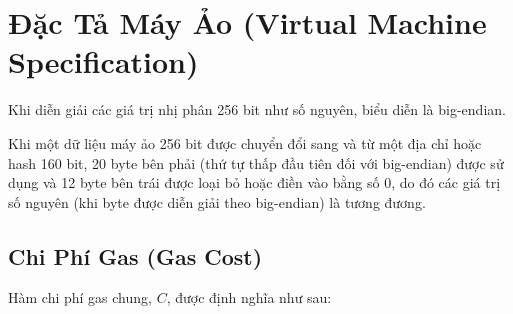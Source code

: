 \documentclass[9pt,oneside]{amsart}
\begin{document}
\section{Đặc Tả Máy Ảo (Virtual Machine Specification)}\label{app:vm}

Khi diễn giải các giá trị nhị phân 256 bit như số nguyên, biểu diễn là big-endian.

Khi một dữ liệu máy ảo 256 bit được chuyển đổi sang và từ một địa chỉ hoặc hash 160 bit, 20 byte bên phải (thứ tự thấp đầu tiên đối với big-endian) được sử dụng và 12 byte bên trái được loại bỏ hoặc điền vào bằng số 0, do đó các giá trị số nguyên (khi byte được diễn giải theo big-endian) là tương đương.

\subsection{Chi Phí Gas (Gas Cost)}

Hàm chi phí gas chung,  $C$, được định nghĩa như sau:
\end{document}
